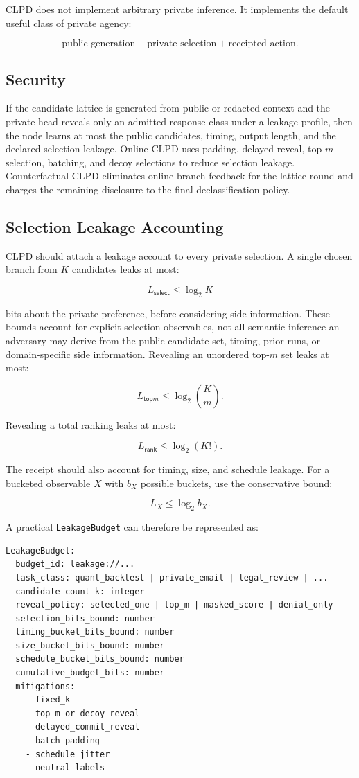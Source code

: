\documentclass[11pt]{article}
\newcommand{\code}[1]{\texttt{#1}}
\begin{document}
CLPD does not implement arbitrary private inference. It implements the default
useful class of private agency:

\[
\text{public generation} + \text{private selection} + \text{receipted action}.
\]

\subsection{Security}

If the candidate lattice is generated from public or redacted context and the
private head reveals only an admitted response class under a leakage profile,
then the node learns at most the public candidates, timing, output length, and
the declared selection leakage. Online CLPD uses padding, delayed reveal,
top-\(m\) selection, batching, and decoy selections to reduce selection leakage.
Counterfactual CLPD eliminates online branch feedback for the lattice round and
charges the remaining disclosure to the final declassification policy.

\subsection{Selection Leakage Accounting}

CLPD should attach a leakage account to every private selection. A single
chosen branch from \(K\) candidates leaks at most:

\[
L_{\mathsf{select}} \leq \log_2 K
\]

\noindent bits about the private preference, before considering side
information. These bounds account for explicit selection observables, not all
semantic inference an adversary may derive from the public candidate set,
timing, prior runs, or domain-specific side information. Revealing an
unordered top-\(m\) set leaks at most:

\[
L_{\mathsf{top}m} \leq \log_2 \binom{K}{m}.
\]

Revealing a total ranking leaks at most:

\[
L_{\mathsf{rank}} \leq \log_2(K!).
\]

The receipt should also account for timing, size, and schedule leakage. For a
bucketed observable \(X\) with \(b_X\) possible buckets, use the conservative
bound:

\[
L_X \leq \log_2 b_X.
\]

A practical \code{LeakageBudget} can therefore be represented as:

\begin{Verbatim}[fontsize=\small]
LeakageBudget:
  budget_id: leakage://...
  task_class: quant_backtest | private_email | legal_review | ...
  candidate_count_k: integer
  reveal_policy: selected_one | top_m | masked_score | denial_only
  selection_bits_bound: number
  timing_bucket_bits_bound: number
  size_bucket_bits_bound: number
  schedule_bucket_bits_bound: number
  cumulative_budget_bits: number
  mitigations:
    - fixed_k
    - top_m_or_decoy_reveal
    - delayed_commit_reveal
    - batch_padding
    - schedule_jitter
    - neutral_labels
\end{Verbatim}
\end{document}
